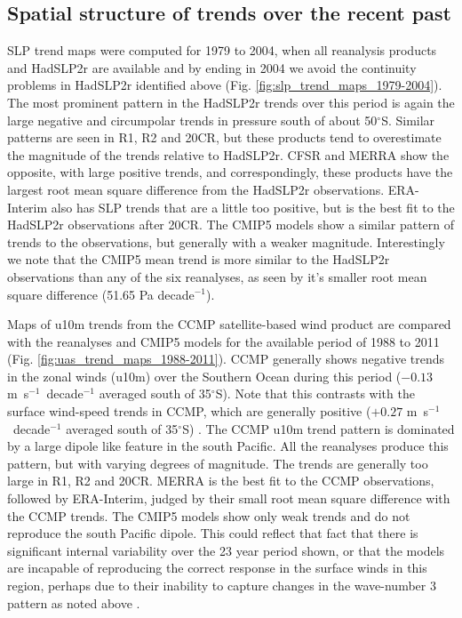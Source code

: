 \documentclass{ametsoc}
\begin{document}
\subsection{Spatial structure of trends over the recent past}
SLP trend maps were computed for 1979 to 2004, when all reanalysis products and HadSLP2r are available
and by ending in 2004 we avoid the continuity problems in HadSLP2r identified above 
(Fig. \ref{fig:slp_trend_maps_1979-2004}). The most prominent pattern in the HadSLP2r trends
over this period is again the large negative and circumpolar trends in pressure 
south of about 50$^{\circ}$S. Similar patterns are seen in R1, R2 and 20CR, but these products
tend to overestimate the magnitude of the trends relative to HadSLP2r. CFSR and MERRA show the opposite, with large
positive trends, and correspondingly, these products have the largest root mean square difference
from the HadSLP2r observations. ERA-Interim also has SLP trends that are a little too positive, but 
is the best fit to the HadSLP2r observations after 20CR.  The CMIP5 models show a similar pattern 
of trends to the observations,
but generally with a weaker magnitude. Interestingly we note that the CMIP5 mean trend is more similar to
the HadSLP2r observations than any of the six reanalyses, as seen by it's smaller root mean square 
difference (51.65 Pa decade$^{-1}$).

Maps of u10m trends from the CCMP satellite-based wind product are compared with the 
reanalyses and CMIP5 models for the available period of 1988 to 2011 
(Fig. \ref{fig:uas_trend_maps_1988-2011}). CCMP generally shows negative trends in the zonal winds
(u10m) over the Southern Ocean during this period ($-0.13$ m~s$^{-1}$~decade$^{-1}$ averaged south of 
35$^{\circ}$S). Note that this contrasts with the surface wind-speed
trends in CCMP, which are generally positive ($+0.27$ m~s$^{-1}$~decade$^{-1}$ averaged south of 
35$^{\circ}$S) \citep{Li_et_al_2013, Wanninkhof_et_al_2013}. The CCMP u10m trend pattern 
is dominated by a large dipole like feature in
the south Pacific. All the reanalyses produce this pattern, but with varying degrees of magnitude. The
trends are generally too large in R1, R2 and 20CR. MERRA is the best fit to the CCMP observations, followed
by ERA-Interim, judged by their small root mean square difference with the CCMP trends. The CMIP5 models 
show only weak trends and do not reproduce the south Pacific dipole. 
This could reflect that fact that there is significant internal variability over the 23 year period
shown, or that the models are incapable of reproducing the correct response in the surface winds
in this region, perhaps due to their inability to capture changes in the wave-number 3 pattern
as noted above \citep{Marshall_Bracegirdle_2014}.
\end{document}
